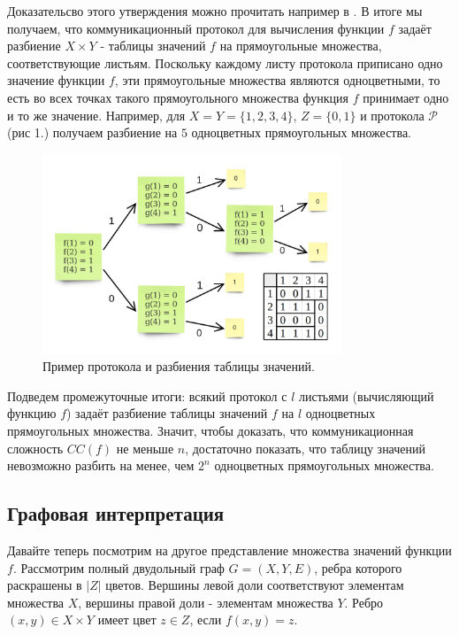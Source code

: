 \documentclass[a4paper]{article}
\begin{document}
Доказательсво этого утверждения можно прочитать например в \cite{KushilevitzNisan}. В итоге мы получаем,
что коммуникационный протокол для вычисления функции $f$ задаёт разбиение $X\times Y$ - 
таблицы значений $f$ на прямоугольные множества, соответствующие листьям. Поскольку каждому
листу протокола приписано одно значение функции $f$, эти прямоугольные множества являются одноцветными,
то есть во всех точках такого прямоугольного множества функция $f$ принимает одно и то же значение.
Например, для $X = Y = \{1, 2, 3, 4\}$, $Z = \{0, 1\}$ и протокола $\mathcal{P}$ (рис 1.) получаем 
разбиение на $5$ одноцветных прямоугольных множества. 

\begin{figure}
	\centering
	\includegraphics[width=0.8\textwidth]{images/protocol.png}
	\caption{Пример протокола и разбиения таблицы значений.}
\end{figure}

Подведем промежуточные итоги: всякий протокол с $l$ листьями (вычисляющий функцию $f$) задаёт разбиение
таблицы значений $f$ на $l$ одноцветных прямоугольных множества. Значит, чтобы доказать, что коммуникационная 
сложность $CC(f)$ не меньше $n$, достаточно показать, что таблицу значений невозможно разбить на менее,
чем $2^n$ одноцветных прямоугольных множества.

\subsection{Графовая интерпретация}

Давайте теперь посмотрим на другое представление множества значений функции $f$. Рассмотрим полный 
двудольный граф $G = (X, Y, E)$, ребра которого раскрашены в $|Z|$ цветов. Вершины левой доли 
соответствуют элементам множества $X$, вершины правой доли - элементам множества $Y$. Ребро 
$(x, y) \in X\times Y$ имеет цвет $z \in Z$, если $f(x, y) = z$.
\end{document}
